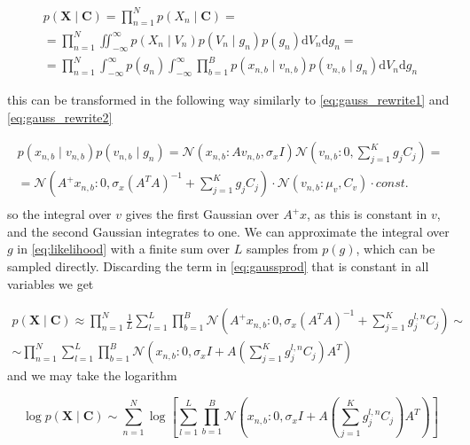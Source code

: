 \documentclass{paper}
\begin{document}
\begin{equation} \label{eq:likelihood}
\begin{split}
p(\mathbf{X} \mid \mathbf{C}) = \prod_{n=1}^N p(X_n \mid \mathbf{C}) = \\
= \prod_{n=1}^N \iint_{-\infty}^{\infty} p(X_n \mid V_n) p(V_n \mid g_n) p(g_n) \mathrm{d}V_n\mathrm{d}g_n =\\
= \prod_{n=1}^N \int_{-\infty}^{\infty}  p(g_n) \int_{-\infty}^{\infty} \prod_{b=1}^B p(x_{n,b} \mid v_{n,b}) p(v_{n,b} \mid g_n) \mathrm{d}V_n\mathrm{d}g_n
\end{split}
\end{equation}

this can be transformed in the following way similarly to \ref{eq:gauss_rewrite1} and \ref{eq:gauss_rewrite2}

\begin{equation} \label{eq:gaussprod}
\begin{split}
p(x_{n,b} \mid v_{n,b}) p(v_{n,b} \mid g_n) = \mathcal{N}(x_{n,b}:Av_{n,b},\sigma_x I) \mathcal{N}(v_{n,b}:0,\sum_{j=1}^K g_jC_j) = \\
= \mathcal{N}(A^{+}x_{n,b}:0,\sigma_x(A^TA)^{-1} + \sum_{j=1}^K g_jC_j) \cdot \mathcal{N}(v_{n,b}:\mu_v,C_v) \cdot const.\\
\end{split}
\end{equation}
%
so the integral over $v$ gives the first Gaussian over $A^{+}x$, as this is constant in $v$, and the second Gaussian integrates to one. We can approximate the integral over $g$ in \ref{eq:likelihood} with a finite sum over $L$ samples from $p(g)$, which can be sampled directly. Discarding the term in \ref{eq:gaussprod} that is constant in all variables we get

\begin{equation}
\begin{split}
p(\mathbf{X} \mid \mathbf{C}) \approx \prod_{n=1}^N \frac{1}{L} \sum_{l=1}^L \prod_{b=1}^B \mathcal{N}(A^{+}x_{n,b}:0,\sigma_x(A^TA)^{-1} + \sum_{j=1}^K g_j^{l,n} C_j) \sim \\
\sim \prod_{n=1}^N \sum_{l=1}^L  \prod_{b=1}^B \mathcal{N} \left( x_{n,b}:0,\sigma_x I + A \left( \sum_{j=1}^K g_j^{l,n} C_j \right) A^T \right) 
\end{split}
\end{equation}
%
and we may take the logarithm

\begin{equation}
\log p(\mathbf{X} \mid \mathbf{C}) \sim \sum_{n=1}^N \log \left[ \sum_{l=1}^L  \prod_{b=1}^B \mathcal{N} \left( x_{n,b}:0,\sigma_x I + A \left( \sum_{j=1}^K g_j^{l,n} C_j \right) A^T \right) \right]
\end{equation}
\end{document}
